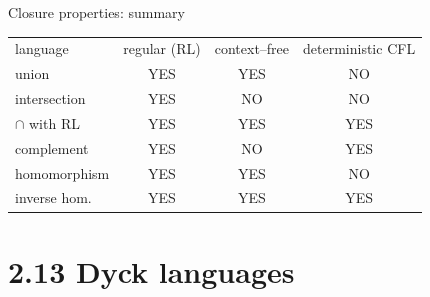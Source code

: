 \documentclass[handout]{beamer}
\begin{document}
\begin{frame}{Closure properties: summary}

    \newcommand{\y}{{\color{blue}YES}}
    \newcommand{\n}{{\color{red}NO}}

    \begin{center}
        \begin{tabular}{l!{\color{gray}\vrule} c!{\color{blue!30!gray}\vrule} c|c|}
        \renewcommand{\arraystretch}{1.5}
        language& regular (RL) & context--free & deterministic CFL\\
        \hline
        union & {\color{blue}YES} &{\color{blue}YES} &{\color{red}NO} \\
        intersection & {\color{blue}YES} &{\color{red}NO}&{\color{red}NO}\\
        \hline
        $\cap$ with RL & {\color{blue}YES} &{\color{blue}YES}&{\color{blue}YES}\\
        complement & {\color{blue}YES} &{\color{red}NO} &{\color{blue}YES} \\
        \hline
        homomorphism & {\color{blue}YES} &{\color{blue}YES} &{\color{red}NO} \\
        inverse hom. & {\color{blue}YES} &{\color{blue}YES} &\y\\
        \hline
        \end{tabular}
    \end{center}

\end{frame}


\section*{2.13 Dyck languages}
\end{document}

